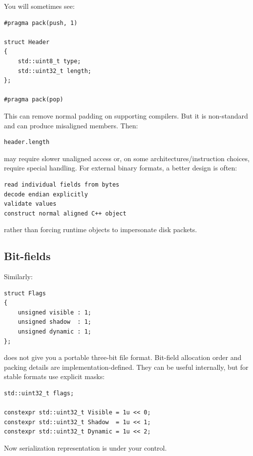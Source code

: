 You will sometimes see:

\begin{verbatim}
#pragma pack(push, 1)

struct Header
{
    std::uint8_t type;
    std::uint32_t length;
};

#pragma pack(pop)
\end{verbatim}

This can remove normal padding on supporting compilers. But it is non-standard and can produce misaligned members. Then:

\begin{verbatim}
header.length
\end{verbatim}

may require slower unaligned access or, on some architectures/instruction choices, require special handling. For external binary formats, a better design is often:

\begin{verbatim}
read individual fields from bytes
decode endian explicitly
validate values
construct normal aligned C++ object
\end{verbatim}

rather than forcing runtime objects to impersonate disk packets.

\subsection{Bit-fields}\label{01-foundations-i-ch003-bit-fields}

\hypertarget{01-foundations-i-ch003-bit-fields}{}

Similarly:

\begin{verbatim}
struct Flags
{
    unsigned visible : 1;
    unsigned shadow  : 1;
    unsigned dynamic : 1;
};
\end{verbatim}

does not give you a portable three-bit file format. Bit-field allocation order and packing details are implementation-defined. They can be useful internally, but for stable formats use explicit masks:

\begin{verbatim}
std::uint32_t flags;

constexpr std::uint32_t Visible = 1u << 0;
constexpr std::uint32_t Shadow  = 1u << 1;
constexpr std::uint32_t Dynamic = 1u << 2;
\end{verbatim}

Now serialization representation is under your control.

